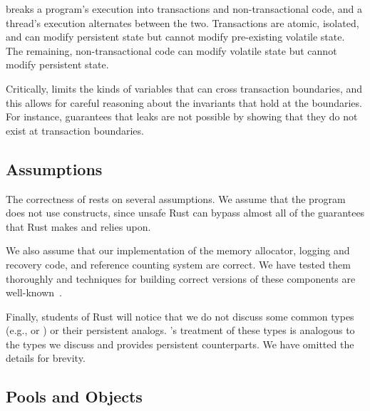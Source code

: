 \this{} breaks a program's execution into transactions and non-transactional
code, and a thread's execution alternates between the two.  Transactions are atomic,
isolated, and can modify persistent state but cannot modify pre-existing
volatile state.  The remaining, non-transactional code
can modify volatile state but cannot modify persistent state.

Critically, \this{} limits the kinds of variables that can cross transaction
boundaries, and this allows for careful reasoning about the invariants that
hold at the boundaries.  For instance, \this{} guarantees that leaks are not
possible by showing that they do not exist at transaction boundaries.

\subsection{Assumptions}


The correctness of \this{} rests on several assumptions.
We assume that the program does not use  constructs, since
unsafe Rust can bypass almost all of the guarantees that Rust makes and relies
upon.  

We also assume that our implementation of the \this{} memory allocator,
logging and recovery code, and reference counting system are correct.  We have
tested them thoroughly and techniques for building correct versions of these
components are well-known~\cite{nvheaps,mnemosyne,atlas,pmdk,oracle-nvm-direct}.

Finally, students of Rust will notice that we do not discuss some common types
(e.g.,  or ) or their persistent analogs.
\This{}'s treatment of these types is analogous to the types we discuss and \this{}
provides persistent counterparts.  We have omitted the details for brevity.

\subsection{\This{} Pools and Objects}

